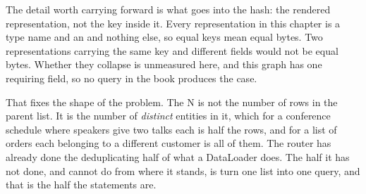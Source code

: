 %
The detail worth carrying forward is what goes into the hash: the rendered
representation, not the key inside it. Every representation in this chapter is a
type name and an  and nothing else, so equal keys mean equal bytes. Two
representations carrying the same key and different  fields
would not be equal bytes. Whether they collapse is unmeasured here, and this
graph has one requiring field, so no query in the book produces the case.

%
That fixes the shape of the problem. The N is not the number of rows in the
parent list. It is the number of \emph{distinct} entities in it, which for a
conference schedule where speakers give two talks each is half the rows, and for
a list of orders each belonging to a different customer is all of them. The
router has already done the deduplicating half of what a DataLoader does. The
half it has not done, and cannot do from where it stands, is turn one list into
one query, and that is the half the statements are.
%
